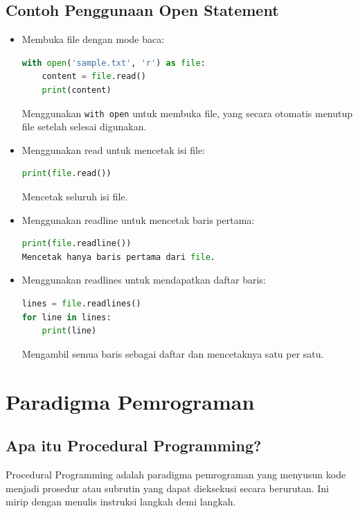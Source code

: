 \documentclass{article}
\begin{document}
\subsection{Contoh Penggunaan Open Statement}
\begin{itemize}
    \item Membuka file dengan mode baca:
          \begin{lstlisting}[language=Python, caption={}, captionpos=b]
with open('sample.txt', 'r') as file:
    content = file.read()
    print(content)
\end{lstlisting}
          Menggunakan \verb|with open| untuk membuka file, yang secara otomatis menutup file setelah selesai digunakan.

    \item Menggunakan read untuk mencetak isi file:
          \begin{lstlisting}[language=Python, caption={}, captionpos=b]
print(file.read())
\end{lstlisting}
          Mencetak seluruh isi file.

    \item Menggunakan readline untuk mencetak baris pertama:
          \begin{lstlisting}[language=Python, caption={}, captionpos=b]
print(file.readline())
Mencetak hanya baris pertama dari file.

\end{lstlisting}
    \item Menggunakan readlines untuk mendapatkan daftar baris:
          \begin{lstlisting}[language=Python, caption={}, captionpos=b]
lines = file.readlines()
for line in lines:
    print(line)
\end{lstlisting}
          Mengambil semua baris sebagai daftar dan mencetaknya satu per satu.
\end{itemize}

\newpage

\section{Paradigma Pemrograman}

\subsection{Apa itu Procedural Programming?}
Procedural Programming adalah paradigma pemrograman yang menyusun kode menjadi prosedur atau subrutin yang dapat dieksekusi secara berurutan. Ini mirip dengan menulis instruksi langkah demi langkah.
\end{document}
